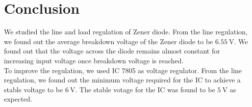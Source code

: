 \documentclass{scrartcl}
\begin{document}
\section{Conclusion}
We studied the line and load regulation of Zener diode. From the line regulation, we found out the average breakdown voltage of the Zener diode to be $6.55 \ \mathrm{V}$. We found out that the voltage across the diode remains almost constant for increasing input voltage once breakdown voltage is reached. \\[0.3cm]
To improve the regulation, we used IC 7805 as voltage regulator. From the line regulation, we found out the minimum voltage required for the IC to achieve a stable voltage to be $6 \ \mathrm{V}$. The stable votage for the IC was found to be $5 \ \mathrm{V}$ as expected.  
\end{document}
